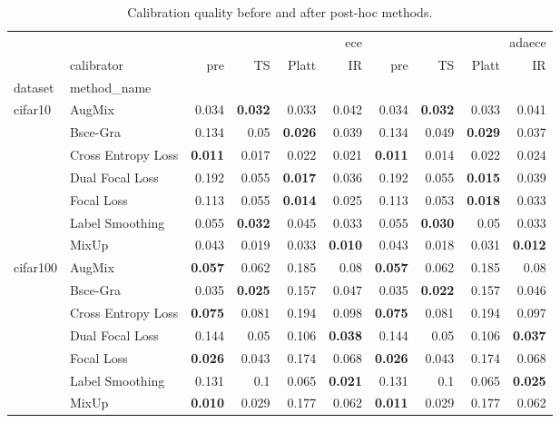 
        \begin{table}[htbp]
        \centering
        \scriptsize
        \setlength{\tabcolsep}{4pt}
        \caption{Calibration quality before and after post-hoc methods.}
        \label{tab:calibration_summary}
        \begin{tabular}{l l rrrr rrrr}
\toprule
 &  & \multicolumn{4}{r}{ece} & \multicolumn{4}{r}{adaece} \\
 & calibrator & pre & TS & Platt & IR & pre & TS & Platt & IR \\
dataset & method_name &  &  &  &  &  &  &  &  \\
\midrule
\multirow[t]{7}{*}{cifar10} & AugMix & 0.034 & \textbf{0.032} & 0.033 & 0.042 & 0.034 & \textbf{0.032} & 0.033 & 0.041 \\
 & Bsce-Gra & 0.134 & 0.05 & \textbf{0.026} & 0.039 & 0.134 & 0.049 & \textbf{0.029} & 0.037 \\
 & Cross Entropy Loss & \textbf{0.011} & 0.017 & 0.022 & 0.021 & \textbf{0.011} & 0.014 & 0.022 & 0.024 \\
 & Dual Focal Loss & 0.192 & 0.055 & \textbf{0.017} & 0.036 & 0.192 & 0.055 & \textbf{0.015} & 0.039 \\
 & Focal Loss & 0.113 & 0.055 & \textbf{0.014} & 0.025 & 0.113 & 0.053 & \textbf{0.018} & 0.033 \\
 & Label Smoothing & 0.055 & \textbf{0.032} & 0.045 & 0.033 & 0.055 & \textbf{0.030} & 0.05 & 0.033 \\
 & MixUp & 0.043 & 0.019 & 0.033 & \textbf{0.010} & 0.043 & 0.018 & 0.031 & \textbf{0.012} \\
\cline{1-10}
\multirow[t]{7}{*}{cifar100} & AugMix & \textbf{0.057} & 0.062 & 0.185 & 0.08 & \textbf{0.057} & 0.062 & 0.185 & 0.08 \\
 & Bsce-Gra & 0.035 & \textbf{0.025} & 0.157 & 0.047 & 0.035 & \textbf{0.022} & 0.157 & 0.046 \\
 & Cross Entropy Loss & \textbf{0.075} & 0.081 & 0.194 & 0.098 & \textbf{0.075} & 0.081 & 0.194 & 0.097 \\
 & Dual Focal Loss & 0.144 & 0.05 & 0.106 & \textbf{0.038} & 0.144 & 0.05 & 0.106 & \textbf{0.037} \\
 & Focal Loss & \textbf{0.026} & 0.043 & 0.174 & 0.068 & \textbf{0.026} & 0.043 & 0.174 & 0.068 \\
 & Label Smoothing & 0.131 & 0.1 & 0.065 & \textbf{0.021} & 0.131 & 0.1 & 0.065 & \textbf{0.025} \\
 & MixUp & \textbf{0.010} & 0.029 & 0.177 & 0.062 & \textbf{0.011} & 0.029 & 0.177 & 0.062 \\

\end{tabular}
\end{table}
